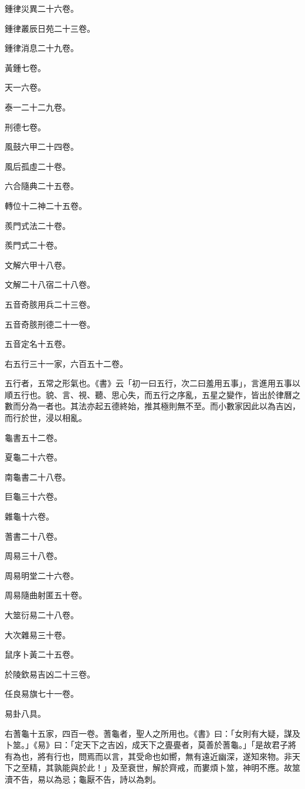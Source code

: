\begin{pinyinscope}
鍾律災異二十六卷。

鍾律叢辰日苑二十三卷。

鍾律消息二十九卷。

黃鍾七卷。

天一六卷。

泰一二十二九卷。

刑德七卷。

風鼓六甲二十四卷。

風后孤虛二十卷。

六合隨典二十五卷。

轉位十二神二十五卷。

羨門式法二十卷。

羨門式二十卷。

文解六甲十八卷。

文解二十八宿二十八卷。

五音奇胲用兵二十三卷。

五音奇胲刑德二十一卷。

五音定名十五卷。

右五行三十一家，六百五十二卷。

五行者，五常之形氣也。《書》云「初一曰五行，次二曰羞用五事」，言進用五事以順五行也。貌、言、視、聽、思心失，而五行之序亂，五星之變作，皆出於律曆之數而分為一者也。其法亦起五德終始，推其極則無不至。而小數家因此以為吉凶，而行於世，浸以相亂。

龜書五十二卷。

夏龜二十六卷。

南龜書二十八卷。

巨龜三十六卷。

雜龜十六卷。

蓍書二十八卷。

周易三十八卷。

周易明堂二十六卷。

周易隨曲射匿五十卷。

大筮衍易二十八卷。

大次雜易三十卷。

鼠序卜黃二十五卷。

於陵欽易吉凶二十三卷。

任良易旗七十一卷。

易卦八具。

右蓍龜十五家，四百一卷。蓍龜者，聖人之所用也。《書》曰：「女則有大疑，謀及卜筮。」《易》曰：「定天下之吉凶，成天下之亹亹者，莫善於蓍龜。」「是故君子將有為也，將有行也，問焉而以言，其受命也如嚮，無有遠近幽深，遂知來物。非天下之至精，其孰能與於此！」及至衰世，解於齊戒，而婁煩卜筮，神明不應。故筮瀆不告，易以為忌；龜厭不告，詩以為刺。


\end{pinyinscope}
